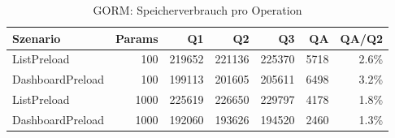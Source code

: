 \begin{table}[ht]
\centering
\caption{GORM: Speicherverbrauch pro Operation}
\begin{tabular}{lrrrrrr}
\toprule
Szenario & Params & Q1 & Q2 & Q3 & QA & QA/Q2 \\
\midrule
		ListPreload & 100 & 219652 & 221136 & 225370 & 5718 & 2.6\% \\
		DashboardPreload & 100 & 199113 & 201605 & 205611 & 6498 & 3.2\% \\
		ListPreload & 1000 & 225619 & 226650 & 229797 & 4178 & 1.8\% \\
		DashboardPreload & 1000 & 192060 & 193626 & 194520 & 2460 & 1.3\% \\
\bottomrule
\end{tabular}
\label{tab:benchmark_gorm_bytesperop}
\end{table}
	